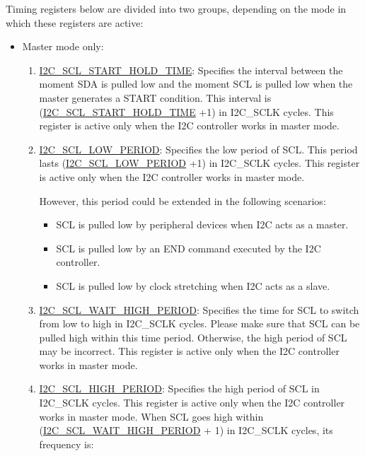 \documentclass[main\_\_EN.tex]{subfiles}
\begin{document}
Timing registers below are divided into two groups, depending on the mode in which these registers are active:

\begin{itemize}

\item Master mode only:

\begin{enumerate}
\item \hyperref[fielddesc:I2CSCLSTARTHOLDTIME]{I2C\_SCL\_START\_HOLD\_TIME}:
Specifies the interval between the moment SDA is pulled low and the moment SCL is pulled low when the master generates a START condition. This interval is (\hyperref[fielddesc:I2CSCLSTARTHOLDTIME]{I2C\_SCL\_START\_HOLD\_TIME} +1) in I2C\_SCLK cycles. This register is active only when the I2C controller works in master mode.

\item \hyperref[fielddesc:I2CSCLLOWPERIOD]{I2C\_SCL\_LOW\_PERIOD}:
Specifies the low period of SCL. This period lasts (\hyperref[fielddesc:I2CSCLLOWPERIOD]{I2C\_SCL\_LOW\_PERIOD} +1) in I2C\_SCLK cycles. This register is active only when the I2C controller works in master mode.

However, this period could be extended in the following scenarios:

\begin{itemize}
    \item SCL is pulled low by peripheral devices when I2C acts as a master.
    \item SCL is pulled low by an END command executed by the I2C controller.
    \item SCL is pulled low by clock stretching when I2C acts as a slave.
\end{itemize}

\item \hyperref[fielddesc:I2CSCLWAITHIGHPERIOD]{I2C\_SCL\_WAIT\_HIGH\_PERIOD}:
Specifies the time for SCL to switch from low to high in I2C\_SCLK cycles. Please make sure that SCL can be pulled high within this time period. Otherwise, the high period of SCL may be incorrect. This register is active only when the I2C controller works in master mode.

\item \hyperref[fielddesc:I2CSCLHIGHPERIOD]{I2C\_SCL\_HIGH\_PERIOD}:
Specifies the high period of SCL in I2C\_SCLK cycles. This register is active only when the I2C controller works in master mode.
When SCL goes high within (\hyperref[fielddesc:I2CSCLWAITHIGHPERIOD]{I2C\_SCL\_WAIT\_HIGH\_PERIOD} + 1) in I2C\_SCLK cycles, its frequency is:


\end{enumerate}
\end{itemize}
\end{document}
